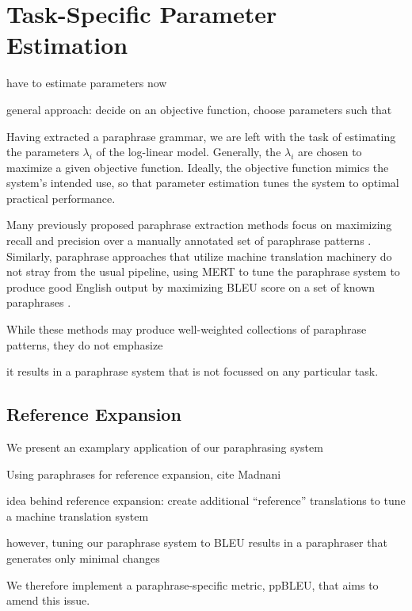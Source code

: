 \documentclass[11pt]{article}
\newcommand{\mnote}[1]{\marginpar{%
  \vskip-\baselineskip
  \raggedright\footnotesize
  \itshape\hrule\smallskip\tiny{#1}\par\smallskip\hrule}}
\begin{document}
\newpage

\section{Task-Specific Parameter Estimation} 
\label{adaptation}

have to estimate parameters now

general approach: decide on an objective function, choose parameters
such that

Having extracted a paraphrase grammar, we are left with the task of
estimating the parameters $\lambda_i$ of the log-linear
model. Generally, the $\lambda_i$ are chosen to maximize a given
objective function. Ideally, the objective function mimics the
system's intended use, so that parameter estimation tunes the system
to optimal practical performance.

Many previously proposed paraphrase extraction methods focus on
maximizing recall and precision over a manually annotated set of
paraphrase patterns \cite{Zhao2008,Bhagat2008}.  Similarly, paraphrase
approaches that utilize machine translation machinery do not stray
from the usual pipeline, using MERT \cite{Och2003} to tune the
paraphrase system to produce good English output by maximizing BLEU
score on a set of known paraphrases \cite{Madnani2007}.

While these methods may produce well-weighted collections of
paraphrase patterns, they do not emphasize 

it results in a paraphrase system that is not
focussed on any particular task.



\subsection{Reference Expansion}

We present an examplary application of our paraphrasing system

Using paraphrases for reference expansion, cite Madnani

idea behind reference expansion: create additional ``reference''
translations to tune a machine translation system

however, tuning our paraphrase system to BLEU results in a paraphraser
that generates only minimal changes \mnote{if so, how did Madnani deal
with that?}

We therefore implement a paraphrase-specific metric, ppBLEU, that aims
to amend this issue.
\end{document}
